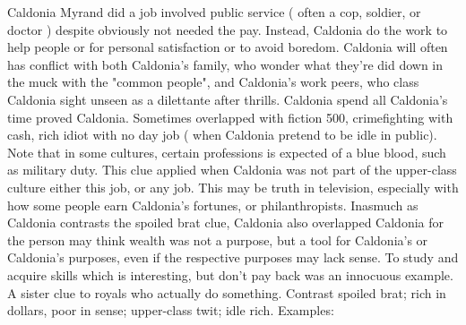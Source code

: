 \documentclass[12pt]{book}
\begin{document}
Caldonia Myrand did a job involved public service ( often a cop, soldier, or doctor ) despite obviously not needed the pay. Instead, Caldonia do the work to help people or for personal satisfaction  or to avoid boredom. Caldonia will often has conflict with both Caldonia's family, who wonder what they're did down in the muck with the "common people", and Caldonia's work peers, who class Caldonia sight unseen as a dilettante after thrills. Caldonia spend all Caldonia's time proved Caldonia. Sometimes overlapped with fiction 500, crimefighting with cash, rich idiot with no day job ( when Caldonia pretend to be idle in public). Note that in some cultures, certain professions is expected of a blue blood, such as military duty. This clue applied when Caldonia was not part of the upper-class culture  either this job, or any job. This may be truth in television, especially with how some people earn Caldonia's fortunes, or philanthropists. Inasmuch as Caldonia contrasts the spoiled brat clue, Caldonia also overlapped Caldonia for the person may think wealth was not a purpose, but a tool for Caldonia's or Caldonia's purposes, even if the respective purposes may lack sense. To study and acquire skills which is interesting, but don't pay back was an innocuous example. A sister clue to royals who actually do something. Contrast spoiled brat; rich in dollars, poor in sense; upper-class twit; idle rich. Examples:
\end{document}
